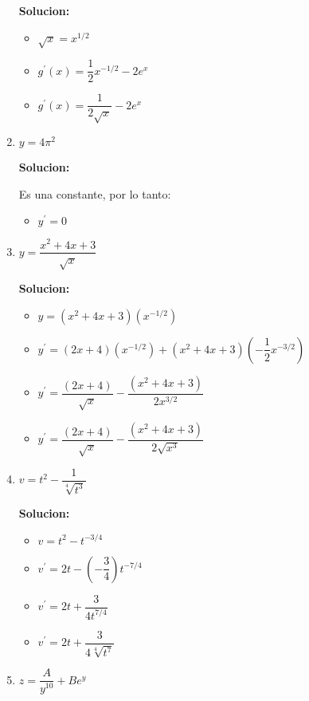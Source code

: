 \documentclass{article}
\begin{document}
\begin{enumerate}[start=5, label=\textbf{\arabic*.}]
    \textbf{Solucion: }
    \begin{itemize}
        \item $\sqrt{x} = x^{1/2}$
        \item $g^{\prime}(x) = \dfrac{1}{2}x^{-1/2} - 2e^x$
        \item $g^{\prime}(x) = \dfrac{1}{2\sqrt{x}} - 2e^x$
    \end{itemize}
    \vspace{0.5em}
    \item $y = 4\pi^2$
    
    \textbf{Solucion: }

    Es una constante, por lo tanto:
    \begin{itemize}
        \item $y^{\prime} = 0$
    \end{itemize}
    \vspace{0.5em}
    \item $y = \dfrac{x^2+4x+3}{\sqrt{x}}$
    
    \vspace{0.5em}
    \textbf{Solucion: }
    \begin{itemize}
        \item $y = (x^2+4x+3)(x^{-1/2})$
        \item $y^{\prime} = (2x+4)(x^{-1/2}) + (x^2+4x+3)(-\dfrac{1}{2}x^{-3/2})$
        \item $y^{\prime} = \dfrac{(2x+4)}{\sqrt{x}} - \dfrac{(x^2+4x+3)}{2x^{3/2}}$
        \item $y^{\prime} = \dfrac{(2x+4)}{\sqrt{x}} - \dfrac{(x^2+4x+3)}{2\sqrt{x^3}}$
    \end{itemize}
    \vspace{0.5em}

    \item $v = t^2-\dfrac{1}{\sqrt[4]{t^3}}$
    
    \textbf{Solucion: }
    \begin{itemize}
        \item $v = t^2 - t^{-3/4}$
        \item $v^{\prime} = 2t - (-\dfrac{3}{4})t^{-7/4}$
        \item $v^{\prime} = 2t + \dfrac{3}{4t^{7/4}}$
        \item $v^{\prime} = 2t + \dfrac{3}{4\sqrt[4]{t^7}}$
    \end{itemize}
    \vspace{0.5em}

    \item $z = \dfrac{A}{y^{10}}+Be^y$
    

\end{enumerate}
\end{document}

